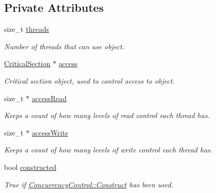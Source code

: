 \subsection*{Private Attributes}
\begin{DoxyCompactItemize}
\item 
size\_\-t \hyperlink{class_concurrency_control_a0a94abcc70c42d61b057bddeb32a6e52}{threads}
\begin{DoxyCompactList}\small\item\em Number of threads that can use object. \item\end{DoxyCompactList}\item 
\hyperlink{class_critical_section}{CriticalSection} $\ast$ \hyperlink{class_concurrency_control_a83a545f7c4a64d11dab7fd1931155182}{access}
\begin{DoxyCompactList}\small\item\em Critical section object, used to control access to object. \item\end{DoxyCompactList}\item 
size\_\-t $\ast$ \hyperlink{class_concurrency_control_af07ace0cc51f0411ac09198e106a1123}{accessRead}
\begin{DoxyCompactList}\small\item\em Keeps a count of how many levels of read control each thread has. \item\end{DoxyCompactList}\item 
size\_\-t $\ast$ \hyperlink{class_concurrency_control_ab0de7910c0fb51c3843f65e8cd40ae7c}{accessWrite}
\begin{DoxyCompactList}\small\item\em Keeps a count of how many levels of write control each thread has. \item\end{DoxyCompactList}\item 
\hypertarget{class_concurrency_control_a727f8073f764bbc193ec8bb962873bb2}{
bool \hyperlink{class_concurrency_control_a727f8073f764bbc193ec8bb962873bb2}{constructed}}
\label{class_concurrency_control_a727f8073f764bbc193ec8bb962873bb2}

\begin{DoxyCompactList}\small\item\em True if \hyperlink{class_concurrency_control_a24e5689f704351208afc2cb7b4efbcec}{ConcurrencyControl::Construct} has been used. \item\end{DoxyCompactList}\end{DoxyCompactItemize}


